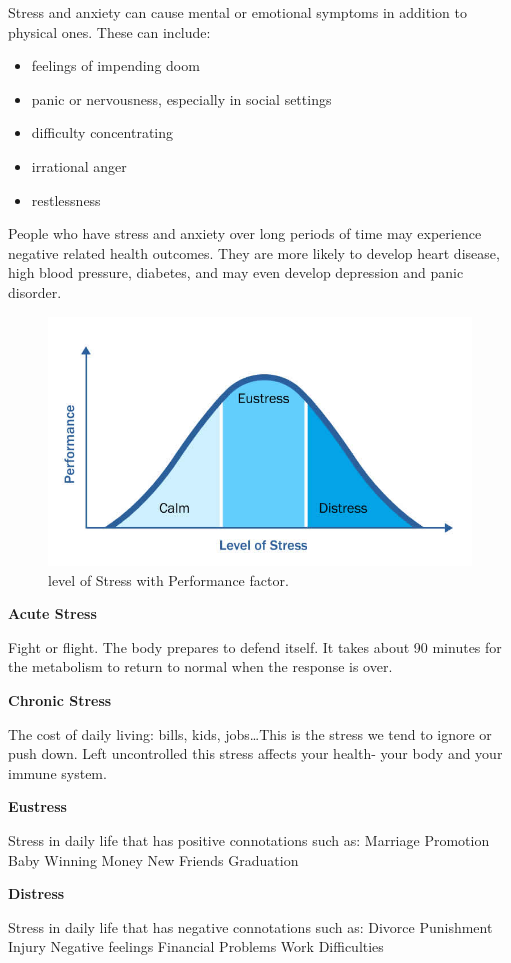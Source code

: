Stress and anxiety can cause mental or emotional symptoms in addition to physical ones. These can include:
\begin{itemize}
    \item feelings of impending doom
    \item panic or nervousness, especially in social settings
    \item difficulty concentrating
    \item irrational anger
    \item restlessness
\end{itemize}{}
    

People who have stress and anxiety over long periods of time may experience negative related health outcomes. They are more likely to develop heart disease, high blood pressure, diabetes, and may even develop depression and panic disorder. 
\begin{figure}[ht!] %
  \centering
  \includegraphics[width=0.6\linewidth]{chap1/images/def_stress.jpg}
  \caption[Stress level with Performance factor]{level of Stress with Performance factor.}
  \label{fig:test1}
\end{figure}

\textbf{Acute Stress}

Fight or flight.  The body prepares to defend itself. It takes about 90 minutes for the metabolism to return to normal when the response is over.

\textbf{Chronic Stress}

The cost of daily living: bills, kids, jobs…This is the stress we tend to ignore or push down.  Left uncontrolled this stress affects your health- your body and your immune system.

\textbf{Eustress}

Stress in daily life that has positive connotations such as:
Marriage
Promotion
Baby
Winning Money
New Friends
Graduation

\textbf{Distress}

Stress in daily life that has negative connotations such as:
Divorce
Punishment
Injury
Negative feelings
Financial Problems
Work Difficulties

